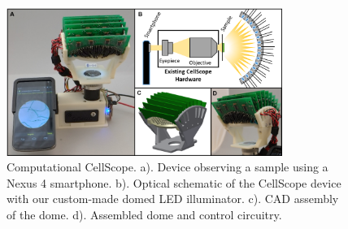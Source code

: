 \begin{figure} [ht]
\begin{center}
\includegraphics[width=0.8\textwidth]{figures/fig_ccs_system.png}
\end{center}
\caption {{Computational CellScope.} {a).} Device observing a sample using a Nexus 4 smartphone. {b).} Optical schematic of the CellScope device with our custom-made domed LED illuminator. {c).} CAD assembly of the dome. {d).} Assembled dome and control circuitry.}
\label{fig:fabrication:device}
\end{figure}

